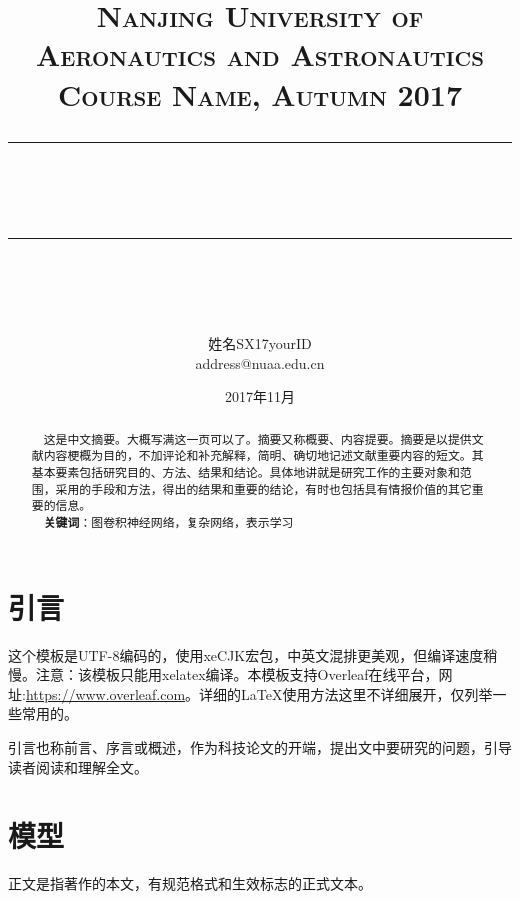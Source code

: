 \documentclass[12pt]{article} %
\newcommand{\horrule}[1]{\rule[0.5ex]{\linewidth}{#1}} 	%
\begin{document}
\title{
{\normalfont\normalsize\textsc{
Nanjing University of Aeronautics and Astronautics\\
Course Name, Autumn 2017 \\[25pt]}}
\horrule{0.5pt}\\
\horrule{1.8pt}\\[20pt]
}
\author{姓名\quad SX17yourID\\address@nuaa.edu.cn}
\date{2017年11月} %

\begin{titlepage}
\maketitle
\vspace{30pt}
\begin{abstract}
\normalsize \ \ 这是中文摘要。大概写满这一页可以了。摘要又称概要、内容提要。摘要是以提供文献内容梗概为目的，不加评论和补充解释，简明、确切地记述文献重要内容的短文。其基本要素包括研究目的、方法、结果和结论。具体地讲就是研究工作的主要对象和范围，采用的手段和方法，得出的结果和重要的结论，有时也包括具有情报价值的其它重要的信息。\\[5pt]
\indent \ \ \textbf{关键词}：图卷积神经网络，复杂网络，表示学习
\end{abstract}
\thispagestyle{empty}
\end{titlepage}

{\hypersetup{linkcolor=black}
\tableofcontents
}
\thispagestyle{empty}

\newpage
\setcounter{page}{1}

\section{引言}
这个模板是UTF-8编码的，使用xeCJK宏包，中英文混排更美观，但编译速度稍慢。注意：该模板只能用xelatex编译。本模板支持Overleaf在线\LaTeXe 平台，网址:\url{https://www.overleaf.com}。详细的\LaTeX 使用方法这里不详细展开，仅列举一些常用的。

引言也称前言、序言或概述，作为科技论文的开端，提出文中要研究的问题，引导读者阅读和理解全文。


\section{模型}
正文是指著作的本文，有规范格式和生效标志的正式文本。
\end{document}
